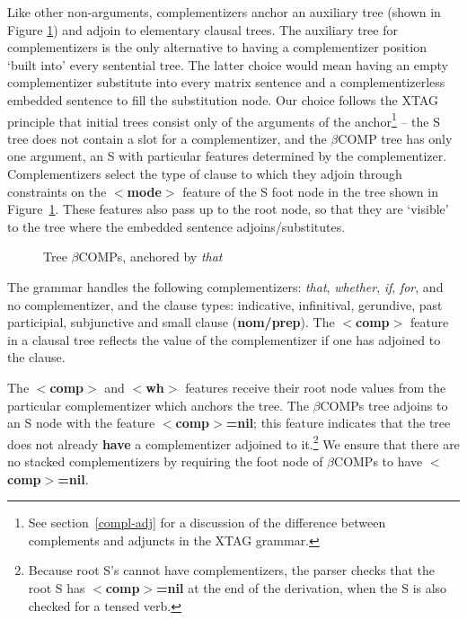 Like other non-arguments, complementizers anchor an auxiliary tree (shown in
Figure \ref{comp-tree}) and adjoin to elementary clausal trees.  The auxiliary
tree for complementizers is the only alternative to having a complementizer
position `built into' every sentential tree.  The latter choice would mean
having an empty complementizer substitute into every matrix sentence and a
complementizerless embedded sentence to fill the substitution node.  Our choice
follows the XTAG principle that initial trees consist only of the arguments of
the anchor\footnote{See section~\ref{compl-adj} for a discussion of the
difference between complements and adjuncts in the XTAG grammar.} -- the S tree
does not contain a slot for a complementizer, and the $\beta$COMP tree has only
one argument, an S with particular features determined by the complementizer.
Complementizers select the type of clause to which they adjoin through
constraints on the {\bf $<$mode$>$} feature of the S foot node in the tree
shown in Figure~\ref{comp-tree}.  These features also pass up to the root node,
so that they are `visible' to the tree where the embedded sentence
adjoins/substitutes.

\begin{figure}[hbt]
\centering
\hspace{0.0in}
\caption{Tree $\beta$COMPs, anchored by {\it that}}
\label{comp-tree}
\end{figure}

The grammar handles the following complementizers: {\it that\/}, {\it
whether\/}, {\it if\/}, {\it for\/}, and no complementizer, and the
clause types: indicative, infinitival, gerundive, past participial,
subjunctive and small clause ({\bf nom/prep}).  The {\bf
$<$comp$>$} feature in a clausal tree reflects the value of the
complementizer if one has adjoined to the clause. 

The {\bf $<$comp$>$} and {\bf $<$wh$>$} features receive their root
node values from the particular complementizer which anchors the tree.
The $\beta$COMPs tree adjoins to an S node with the feature {\bf
$<$comp$>$=nil}; this feature indicates that the tree does not already
{\bf have} a complementizer adjoined to it.\footnote{ Because root S's
cannot have complementizers, the parser checks that the root S has {\bf
$<$comp$>$=nil} at the end of the derivation, when the S is also checked for
a tensed verb.} We ensure that there are no stacked complementizers by
requiring the foot node of $\beta$COMPs to have {\bf $<$comp$>$=nil}.

